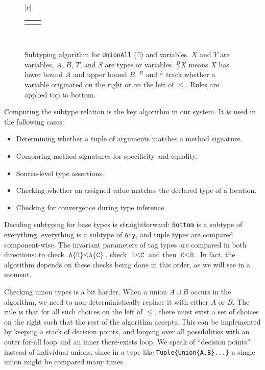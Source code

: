 \begin{figure}[!t]
\begin{center}
\begin{tabular}{|c|}
\begin{tabular}{cc}
        \hspace{3ex}

        &

        \AxiomC{$^BX^L,\Gamma\ \vdash\ B \leq T$}
        \UnaryInfC{$^BX^L,\Gamma\ \vdash\ X \leq T$}
        \DisplayProof

        \\[8pt]
      \end{tabular}
      \\
      \hline
    \end{tabular}
  \end{center}
  \caption[Subtyping algorithm]{
\small{
    Subtyping algorithm for \texttt{UnionAll} ($\exists$) and variables.
    $X$ and $Y$ are variables, $A$, $B$, $T$, and $S$ are types or variables.
    $_A^BX$ means $X$ has lower bound $A$ and upper bound $B$.
    $^R$ and $^L$ track whether a variable originated on the right or on the left of
    $\leq$.
    Rules are applied top to bottom.
}
  }
  \label{subtvars}
\end{figure}

Computing the subtype relation is the key algorithm in our system.
It is used in the following cases:

\begin{itemize}
\item Determining whether a tuple of arguments matches a method signature.
\item Comparing method signatures for specificity and equality.
\item Source-level type assertions.
\item Checking whether an assigned value matches the declared type of a
location.
\item Checking for convergence during type inference.
\end{itemize}

Deciding subtyping for base types is straightforward: \texttt{Bottom} is
a subtype of everything, everything is a subtype of \texttt{Any}, and
tuple types are compared component-wise.
The invariant parameters of tag types are compared in both directions: to check
$\texttt{A\{B\}}\leq \texttt{A\{C\}}$, check $\texttt{B}\leq\texttt{C}$ and
then $\texttt{C}\leq\texttt{B}$.
In fact, the algorithm depends on these checks being done in this order, as we
will see in a moment.

Checking union types is a bit harder. When a union $A\cup B$ occurs in the
algorithm, we need to non-deterministically replace it with either $A$ or
$B$. The rule is that for all such choices on the left of $\leq$, there
must exist a set of choices on the right such that the rest of the
algorithm accepts. This can be implemented by keeping a stack of
decision points, and looping over all possibilities with an outer
for-all loop and an inner there-exists loop. We speak of ``decision points''
instead of individual unions, since in a type like \texttt{Tuple\{Union\{A,B\}...\}}
a single union might be compared many times.

